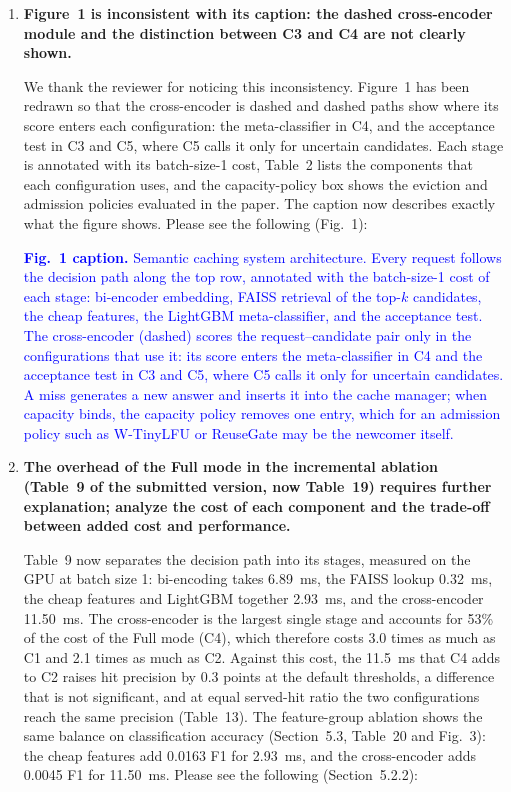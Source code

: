 \documentclass[11pt]{article}
\begin{document}
\begin{enumerate}[leftmargin=*, itemsep=1.2em]
\item \textbf{Figure~1 is inconsistent with its caption: the dashed cross-encoder module and the distinction between C3 and C4 are not clearly shown.}

We thank the reviewer for noticing this inconsistency. Figure~1 has been redrawn so that the cross-encoder is dashed and dashed paths show where its score enters each configuration: the meta-classifier in C4, and the acceptance test in C3 and C5, where C5 calls it only for uncertain candidates. Each stage is annotated with its batch-size-1 cost, Table~2 lists the components that each configuration uses, and the capacity-policy box shows the eviction and admission policies evaluated in the paper. The caption now describes exactly what the figure shows. Please see the following (Fig.~1):

\textcolor{blue}{\textbf{Fig.~1 caption.} Semantic caching system architecture. Every request follows the decision path along the top row, annotated with the batch-size-1 cost of each stage: bi-encoder embedding, FAISS retrieval of the top-$k$ candidates, the cheap features, the LightGBM meta-classifier, and the acceptance test. The cross-encoder (dashed) scores the request--candidate pair only in the configurations that use it: its score enters the meta-classifier in C4 and the acceptance test in C3 and C5, where C5 calls it only for uncertain candidates. A miss generates a new answer and inserts it into the cache manager; when capacity binds, the capacity policy removes one entry, which for an admission policy such as W-TinyLFU or ReuseGate may be the newcomer itself.}

\item \textbf{The overhead of the Full mode in the incremental ablation (Table~9 of the submitted version, now Table~19) requires further explanation; analyze the cost of each component and the trade-off between added cost and performance.}

Table~9 now separates the decision path into its stages, measured on the GPU at batch size 1: bi-encoding takes 6.89~ms, the FAISS lookup 0.32~ms, the cheap features and LightGBM together 2.93~ms, and the cross-encoder 11.50~ms. The cross-encoder is the largest single stage and accounts for 53\% of the cost of the Full mode (C4), which therefore costs 3.0 times as much as C1 and 2.1 times as much as C2. Against this cost, the 11.5~ms that C4 adds to C2 raises hit precision by 0.3 points at the default thresholds, a difference that is not significant, and at equal served-hit ratio the two configurations reach the same precision (Table~13). The feature-group ablation shows the same balance on classification accuracy (Section~5.3, Table~20 and Fig.~3): the cheap features add 0.0163 F1 for 2.93~ms, and the cross-encoder adds 0.0045 F1 for 11.50~ms. Please see the following (Section~5.2.2):


\end{enumerate}
\end{document}

